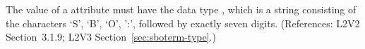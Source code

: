 The value of a  attribute must have the data type
, which is a string consisting of the characters `S', `B',
`O', ':', followed by exactly seven digits.  (References: L2V2 
Section~3.1.9; L2V3 Section~\ref{sec:sboterm-type}.)
